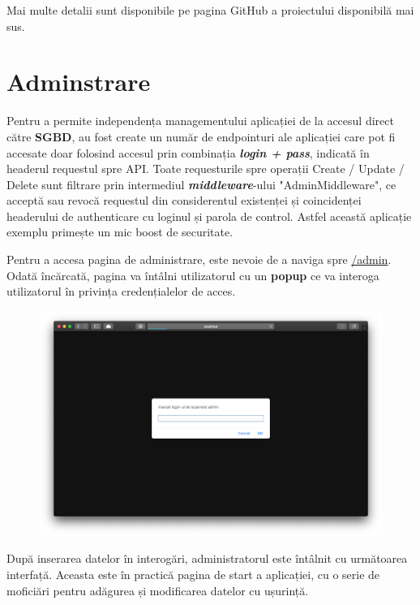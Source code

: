 \documentclass[12pt. a4paper]{report}
\begin{document}
Mai multe detalii sunt disponibile pe pagina GitHub a proiectului disponibilă mai sus.

\section{Adminstrare}
Pentru a permite independența managementului aplicației de la accesul direct către \textbf{SGBD}, au fost create un număr de endpointuri ale aplicației care pot fi accesate doar folosind accesul prin combinația \emph{\textbf{login + pass}}, indicată în headerul requestul spre API. Toate requesturile spre operații Create / Update / Delete sunt filtrare prin intermediul \emph{\textbf{middleware}}-ului "AdminMiddleware", ce acceptă sau revocă requestul din considerentul existenței și coincidenței headerului de authenticare cu loginul și parola de control. Astfel această aplicație exemplu primește un mic boost de securitate.

Pentru a accesa pagina de administrare, este nevoie de a naviga spre \url{/admin}. Odată încărcată, pagina va întâlni utilizatorul cu un \textbf{popup} ce va interoga utilizatorul în privința credențialelor de acces.

\begin{figure}[H]
\centering
	\includegraphics[width=1.0\textwidth]{login_popup}
\end{figure}

După inserarea datelor în interogări, administratorul este întâlnit cu următoarea interfață. Aceasta este în practică pagina de start a aplicației, cu o serie de moficiări pentru adăgurea  și modificarea datelor cu ușurință.
\end{document}
